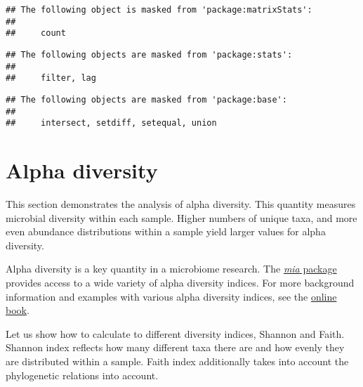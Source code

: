 \documentclass[
  oneside]{book}
\begin{document}
\begin{verbatim}
## The following object is masked from 'package:matrixStats':
## 
##     count
\end{verbatim}

\begin{verbatim}
## The following objects are masked from 'package:stats':
## 
##     filter, lag
\end{verbatim}

\begin{verbatim}
## The following objects are masked from 'package:base':
## 
##     intersect, setdiff, setequal, union
\end{verbatim}

\hypertarget{alpha-diversity}{%
\chapter{Alpha diversity}\label{alpha-diversity}}

This section demonstrates the analysis of alpha diversity. This
quantity measures microbial diversity within each sample. Higher
numbers of unique taxa, and more even abundance distributions within a
sample yield larger values for alpha diversity.

Alpha diversity is a key quantity in a microbiome research. The \href{https://microbiome.github.io/mia/}{\emph{mia}
package} provides access to a wide
variety of alpha diversity indices. For more background information
and examples with various alpha diversity indices, see the \href{https://microbiome.github.io/OMA/microbiome-diversity.html\#alpha-diversity}{online
book}.

Let us show how to calculate to different diversity indices, Shannon
and Faith. Shannon index reflects how many different taxa there are
and how evenly they are distributed within a sample. Faith index
additionally takes into account the phylogenetic relations into
account.
\end{document}
